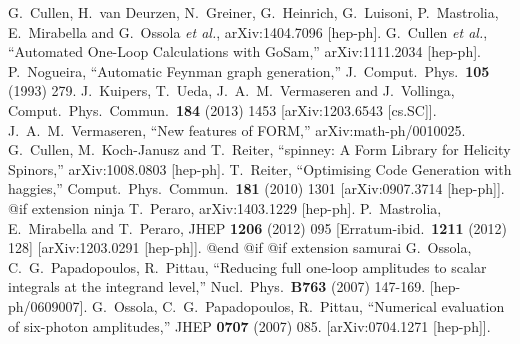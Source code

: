 {{{{{{{{{\begin{thebibliography}{ABC}
  G.~Cullen, H.~van Deurzen, N.~Greiner, G.~Heinrich, G.~Luisoni, P.~Mastrolia, E.~Mirabella and G.~Ossola {\it et al.},
  arXiv:1404.7096 [hep-ph].
  G.~Cullen {\it et al.},
  ``Automated One-Loop Calculations with GoSam,''
  arXiv:1111.2034 [hep-ph].
  P.~Nogueira,
  ``Automatic Feynman graph generation,''
  J.\ Comput.\ Phys.\  {\bf 105} (1993) 279.
  J.~Kuipers, T.~Ueda, J.~A.~M.~Vermaseren and J.~Vollinga,
  Comput.\ Phys.\ Commun.\  {\bf 184} (2013) 1453
  [arXiv:1203.6543 [cs.SC]].
  J.~A.~M.~Vermaseren,
  ``New features of FORM,''
  arXiv:math-ph/0010025.
  G.~Cullen, M.~Koch-Janusz and T.~Reiter,
  ``spinney: A Form Library for Helicity Spinors,''
  arXiv:1008.0803 [hep-ph].
  T.~Reiter,
  ``Optimising Code Generation with haggies,''
  Comput.\ Phys.\ Commun.\  {\bf 181} (2010) 1301
  [arXiv:0907.3714 [hep-ph]].
@if extension ninja %
  T.~Peraro,
  arXiv:1403.1229 [hep-ph].
  P.~Mastrolia, E.~Mirabella and T.~Peraro,
  JHEP {\bf 1206} (2012) 095
   [Erratum-ibid.\  {\bf 1211} (2012) 128]
  [arXiv:1203.0291 [hep-ph]].
@end @if %
@if extension samurai %
  G.~Ossola, C.~G.~Papadopoulos, R.~Pittau,
  ``Reducing full one-loop amplitudes to scalar integrals at the
    integrand level,''
  Nucl.\ Phys.\  {\bf B763 } (2007)  147-169.
  [hep-ph/0609007].
  G.~Ossola, C.~G.~Papadopoulos, R.~Pittau,
  ``Numerical evaluation of six-photon amplitudes,''
  JHEP {\bf 0707 } (2007)  085.
  [arXiv:0704.1271 [hep-ph]].

\end{thebibliography}}}}}}}}}}
